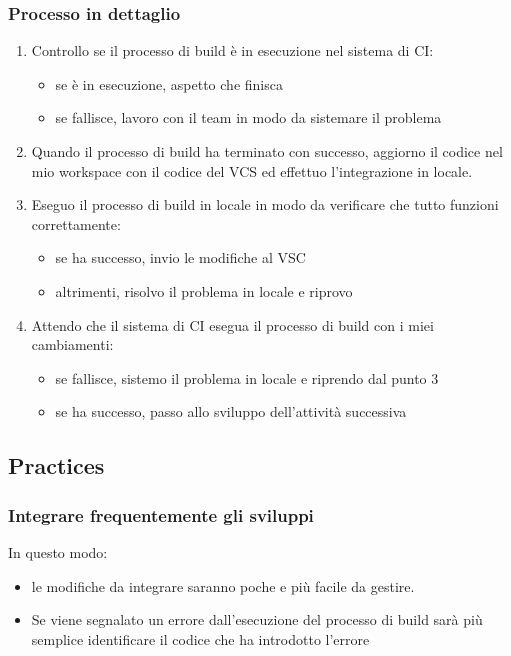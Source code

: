 \subsubsection{Processo in dettaglio}
\begin{enumerate}
    \item Controllo se il processo di build è in esecuzione nel sistema di CI:
    \begin{itemize}
        \item se è in esecuzione, aspetto che finisca
        \item se fallisce, lavoro con il team in modo da sistemare il problema
    \end{itemize}
    \item Quando il processo di build ha terminato con successo, aggiorno il codice nel mio workspace con il codice del VCS ed effettuo l’integrazione in locale.
    \item Eseguo il processo di build in locale in modo da verificare che tutto funzioni correttamente:
    \begin{itemize}
        \item se ha successo, invio le modifiche al VSC
        \item altrimenti, risolvo il problema in locale e riprovo
    \end{itemize}
    \item Attendo che il sistema di CI esegua il processo di build con i miei cambiamenti:
    \begin{itemize}
        \item se fallisce, sistemo il problema in locale e riprendo dal punto 3
        \item se ha successo, passo allo sviluppo dell’attività successiva
    \end{itemize}
\end{enumerate}

\subsection{Practices}

\subsubsection{Integrare frequentemente gli sviluppi}
In questo modo:
\begin{itemize}
    \item le modifiche da integrare saranno poche e più facile da gestire.
    \item Se viene segnalato un errore dall’esecuzione del processo di build sarà più semplice
    identificare il codice che ha introdotto l’errore
\end{itemize}

